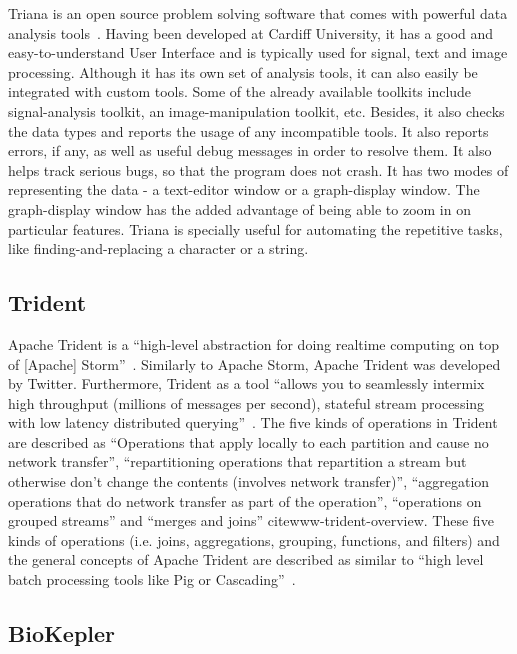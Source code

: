 Triana is an open source problem solving software that comes with
powerful data analysis tools~\cite{trianaDocumentation-1}.  Having
been developed at Cardiff University, it has a good and
easy-to-understand User Interface and is typically used for signal,
text and image processing.  Although it has its own set of analysis
tools, it can also easily be integrated with custom tools.  Some of
the already available toolkits include signal-analysis toolkit, an
image-manipulation toolkit, etc.  Besides, it also checks the data
types and reports the usage of any incompatible tools.  It also
reports errors, if any, as well as useful debug messages in order to
resolve them.  It also helps track serious bugs, so that the program
does not crash.  It has two modes of representing the data - a
text-editor window or a graph-display window.  The graph-display
window has the added advantage of being able to zoom in on particular
features.  Triana is specially useful for automating the repetitive
tasks, like finding-and-replacing a character or a string.
   
\subsection{Trident}

Apache Trident is a ``high-level abstraction for doing realtime
computing on top of [Apache]
Storm''~\cite{www-trident-tutorial}. Similarly to Apache Storm, Apache
Trident was developed by Twitter.  Furthermore, Trident as a tool
``allows you to seamlessly intermix high throughput (millions of
messages per second), stateful stream processing with low latency
distributed querying''~\cite{www-trident-tutorial}.  The five kinds of
operations in Trident are described as ``Operations that apply locally
to each partition and cause no network transfer'', ``repartitioning
operations that repartition a stream but otherwise don't change the
contents (involves network transfer)'', ``aggregation operations that
do network transfer as part of the operation'', ``operations on
grouped streams'' and ``merges and joins'' cite{www-trident-overview}.
These five kinds of operations (i.e. joins, aggregations, grouping,
functions, and filters) and the general concepts of Apache Trident are
described as similar to ``high level batch processing tools like Pig
or Cascading''~\cite{www-trident-tutorial}.

\pv

\subsection{BioKepler}
    
